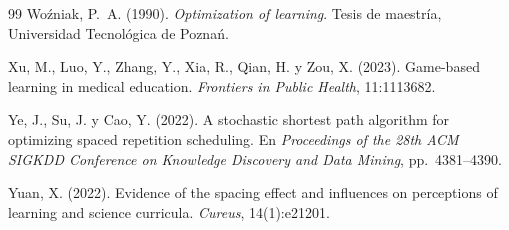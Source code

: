 \documentclass[12pt]{article}
\theoremstyle{definition}
\begin{document}
\begin{thebibliography}{99}
Woźniak, P.~A. (1990).
\newblock \emph{Optimization of learning}.
\newblock Tesis de maestría, Universidad Tecnológica de Poznań.

Xu, M., Luo, Y., Zhang, Y., Xia, R., Qian, H. y Zou, X. (2023).
\newblock Game-based learning in medical education.
\newblock \emph{Frontiers in Public Health}, 11:1113682.

Ye, J., Su, J. y Cao, Y. (2022).
\newblock A stochastic shortest path algorithm for optimizing spaced repetition scheduling.
\newblock En \emph{Proceedings of the 28th ACM SIGKDD Conference on Knowledge Discovery and Data Mining}, pp.~4381--4390.

Yuan, X. (2022).
\newblock Evidence of the spacing effect and influences on perceptions of learning and science curricula.
\newblock \emph{Cureus}, 14(1):e21201.

\end{thebibliography}
\end{document}
